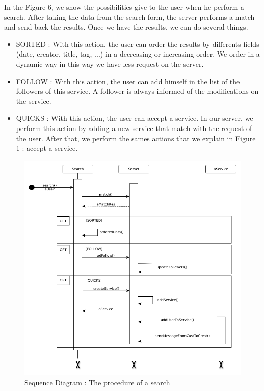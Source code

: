 In the Figure 6, we show the possibilities give to the user when he perform a search. After taking the data from the search form, the server performs a match and send back the results.
Once we have the results, we can do several things.
\begin{itemize}
	\item SORTED : With this action, the user can order the results by differents fields (date, creator, title, tag, ...)  in a decreasing or increasing order. We order in a dynamic way in this way we have less request on the server.
    \item FOLLOW : With this action, the user can add himself in the list of the followers of this service. A follower is always informed of the modifications on the service.
    \item QUICKS : With this action, the user can accept a service.  In our server, we perform this action by adding a new service that match with the request of the user.  After that, we perform the sames actions that we explain in Figure 1 : accept a service.
    
\end{itemize}

\begin{figure}[!ht]
	\begin{center}
		\includegraphics[width=\textwidth]{seq_search.png}
		\caption{Sequence Diagram : The procedure of a search}
		\label{fig:search}
	\end{center}
\end{figure}

